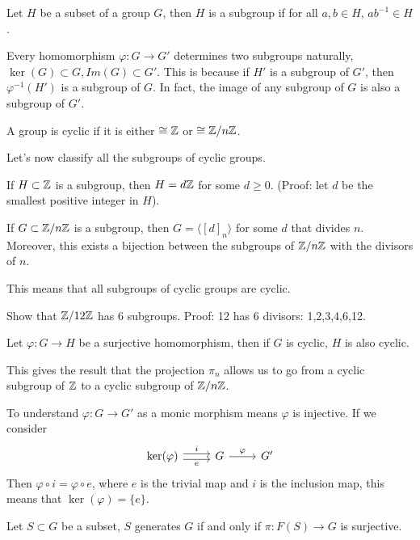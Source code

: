 \begin{prop}
    Let $H$ be a subset of a group $G$, then $H$ is a subgroup if for all $a,b\in H$, $ab^{-1}\in H$.
\end{prop}
Every homomorphism $\varphi:G\to G'$ determines two subgroups naturally, $\ker(G)\subset G, Im(G)\subset G'$. This is because if $H'$ is a subgroup of $G'$, then $\varphi^{-1}(H')$ is a subgroup of $G$. In fact, the image of any subgroup of $G$ is also a subgroup of $G'$.
\begin{defn}
    A group is cyclic if it is either $\cong\mathbb{Z}$ or $\cong \mathbb{Z}/n\mathbb{Z}$.
\end{defn}
Let's now classify all the subgroups of cyclic groups.
\begin{prop}
    If $H\subset\mathbb{Z}$ is a subgroup, then $H=d\mathbb{Z}$ for some $d\geq 0$. (Proof: let $d$ be the smallest positive integer in $H$). 
    
    If $G\subset \mathbb{Z}/n\mathbb{Z}$ is a subgroup, then $G=\langle [d]_n\rangle$ for some $d$ that divides $n$. Moreover, this exists a bijection between the subgroups of $\mathbb{Z}/n\mathbb{Z}$ with the divisors of $n$.
\end{prop}
\begin{idea}
    This means that all subgroups of cyclic groups are cyclic.
\end{idea}
\begin{example}
    Show that $\mathbb{Z}/12\mathbb{Z}$ has 6 subgroups. Proof: 12 has 6 divisors: 1,2,3,4,6,12.
\end{example}
\begin{prop}
    Let $\varphi:G\to H$ be a surjective homomorphism, then if $G$ is cyclic, $H$ is also cyclic.

    This gives the result that the projection $\pi_n$ allows us to go from a cyclic subgroup of $\mathbb{Z}$ to a cyclic subgroup of $\mathbb{Z}/n\mathbb{Z}$.
\end{prop}
To understand $\varphi:G\to G'$ as a monic morphism means $\varphi$ is injective.
If we consider
\begin{equation*}
    \begin{tikzcd}
        {\ker(\varphi)} & G & {G'}
        \arrow["i", shift left, from=1-1, to=1-2]
        \arrow["e"', shift right, from=1-1, to=1-2]
        \arrow["\varphi", from=1-2, to=1-3]
    \end{tikzcd}
\end{equation*}
Then $\varphi\circ i=\varphi\circ e$, where $e$ is the trivial map and $i$ is the inclusion map, this means that $\ker(\varphi)=\{e\}$.
\begin{prop}
    Let $S\subset G$ be a subset, $S$ generates $G$ if and only if $\pi: F(S)\to G$ is surjective.
\end{prop}
